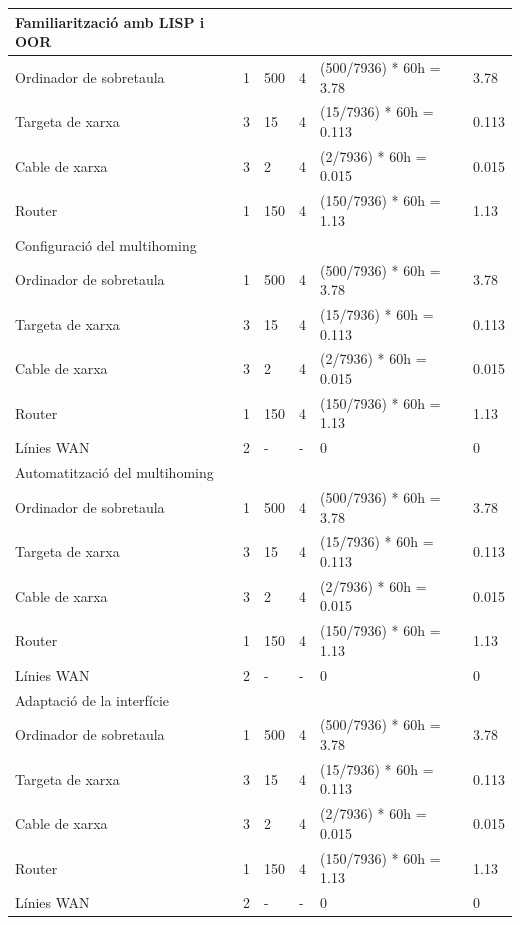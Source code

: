\documentclass[11pt]{article}
\begin{document}
\begin{center}
\begin{tabular}{| l | l | l | l | l | l |}
		Familiarització amb LISP i OOR & & & & & \\ \hline
		Ordinador de sobretaula & 1 & 500 & 4 & (500/7936) * 60h = 3.78 & 3.78 \\ \hline
		Targeta de xarxa & 3 & 15 & 4 & (15/7936) * 60h = 0.113 & 0.113 \\ \hline
		Cable de xarxa & 3 & 2 & 4 & (2/7936) * 60h = 0.015 & 0.015 \\ \hline
		Router & 1 & 150 & 4 & (150/7936) * 60h = 1.13 & 1.13 \\ \hline
		Configuració del multihoming & & & & & \\ \hline
		Ordinador de sobretaula & 1 & 500 & 4 & (500/7936) * 60h = 3.78 & 3.78 \\ \hline
		Targeta de xarxa & 3 & 15 & 4 & (15/7936) * 60h = 0.113 & 0.113 \\ \hline
		Cable de xarxa & 3 & 2 & 4 & (2/7936) * 60h = 0.015 & 0.015 \\ \hline
		Router & 1 & 150 & 4 & (150/7936) * 60h = 1.13 & 1.13 \\ \hline
		Línies WAN & 2 & - & - & 0 & 0 \\ \hline
		Automatització del multihoming & & & & & \\ \hline
		Ordinador de sobretaula & 1 & 500 & 4 & (500/7936) * 60h = 3.78 & 3.78 \\ \hline
		Targeta de xarxa & 3 & 15 & 4 & (15/7936) * 60h = 0.113 & 0.113 \\ \hline
		Cable de xarxa & 3 & 2 & 4 & (2/7936) * 60h = 0.015 & 0.015 \\ \hline
		Router & 1 & 150 & 4 & (150/7936) * 60h = 1.13 & 1.13 \\ \hline
		Línies WAN & 2 & - & - & 0 & 0 \\ \hline
		Adaptació de la interfície & & & & & \\ \hline
		Ordinador de sobretaula & 1 & 500 & 4 & (500/7936) * 60h = 3.78 & 3.78 \\ \hline
		Targeta de xarxa & 3 & 15 & 4 & (15/7936) * 60h = 0.113 & 0.113 \\ \hline
		Cable de xarxa & 3 & 2 & 4 & (2/7936) * 60h = 0.015 & 0.015 \\ \hline
		Router & 1 & 150 & 4 & (150/7936) * 60h = 1.13 & 1.13 \\ \hline
		Línies WAN & 2 & - & - & 0 & 0 \\ \hline
		\hline
	\end{tabular}
	\begin{tabular}{| l | l | l | l | l | l |}
		\hline

\end{tabular}
\end{center}
\end{document}
